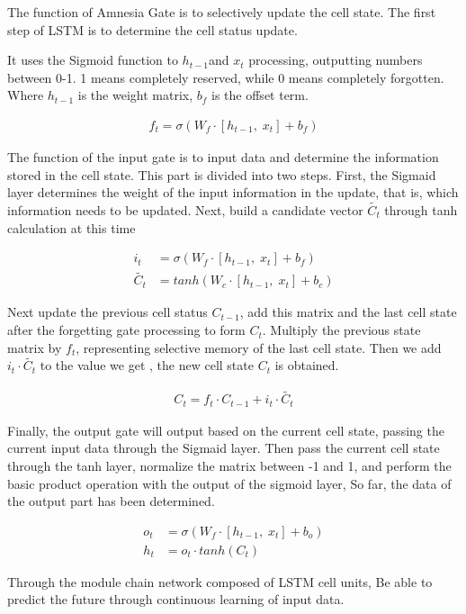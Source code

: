 \documentclass{apmcmthesis}
\begin{document}
The function of Amnesia Gate is to selectively update the cell state. The first step of LSTM is to determine the cell status update.

It uses the Sigmoid function to $h_{t-1} $and $x_t $ processing, outputting numbers between 0-1. 
1 means completely reserved, while 0 means completely forgotten. Where $h_{t-1} $ is the weight matrix, $b_f$ is the offset term.

\begin{align*}
  f_t = \sigma (W_f \cdot [h_{t-1},\; x_t] + b_f)
\end{align*}

The function of the input gate is to input data and determine the information stored in the cell state.
This part is divided into two steps. First, the Sigmaid layer determines the weight of the input information in the update, that is, which information needs to be updated.
Next, build a candidate vector $\tilde{C_t}$ through tanh calculation at this time

\begin{align*}
  i_t &= \sigma (W_f \cdot [h_{t-1},\; x_t] + b_f)\\
  \tilde{C_t}&= tanh(W_c \cdot [h_{t-1},\; x_t] + b_c)
\end{align*}

Next update the previous cell status $C_{t-1}$, add this matrix and the last cell state after the forgetting gate processing to form $C_t$.
Multiply the previous state matrix by $f_t$, representing selective memory of the last cell state.
Then we add $i_t\cdot \tilde{C_t} $ to the value we get  , the new cell state $C_t$ is obtained.

\begin{align*}
  C_t = f_t \cdot C_{t-1} + i_t \cdot \tilde{C_t}
\end{align*}

Finally, the output gate will output based on the current cell state, passing the current input data through the Sigmaid layer.
Then pass the current cell state through the tanh layer, normalize the matrix between -1 and 1, and perform the basic product operation with the output of the sigmoid layer,
So far, the data of the output part has been determined.

\begin{align*}
  o_t &= \sigma (W_f \cdot [h_{t-1},\; x_t] + b_o)\\
  h_t &= o_t \cdot tanh (C_t)
\end{align*}

Through the module chain network composed of LSTM cell units,
Be able to predict the future through continuous learning of input data.
\end{document}

